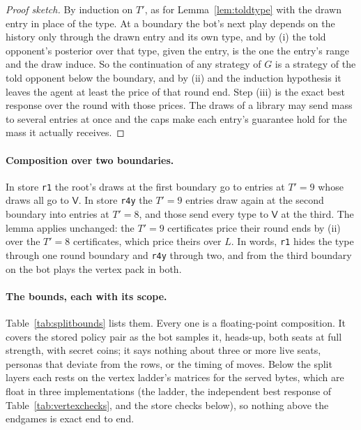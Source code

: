 \documentclass[11pt]{article}
\theoremstyle{plain}
\theoremstyle{definition}
\theoremstyle{remark}
\newcommand{\code}[1]{\texttt{\small #1}}
\newcommand{\game}{\ensuremath{G}}
\begin{document}
\begin{proof}[Proof sketch]
By induction on $T'$, as for Lemma~\ref{lem:toldtype} with the drawn
entry in place of the type. At a boundary the bot's next play depends
on the history only through the drawn entry and its own type, and by
(i) the told opponent's posterior over that type, given the entry, is
the one the entry's range and the draw induce. So the continuation of
any strategy of $\game$ is a strategy of the told opponent below the
boundary, and by (ii) and the induction hypothesis it leaves the agent
at least the price of that round end. Step (iii) is the exact best
response over the round with those prices. The draws of a library may
send mass to several entries at once and the caps make each entry's
guarantee hold for the mass it actually receives.
\end{proof}

\paragraph{Composition over two boundaries.} In store \code{r1} the
root's draws at the first boundary go to entries at $T'=9$ whose draws
all go to $\mathsf{V}$. In store \code{r4y} the $T'=9$ entries draw
again at the second boundary into entries at $T'=8$, and those send
every type to $\mathsf{V}$ at the third. The lemma applies unchanged:
the $T'=9$ certificates price their round ends by (ii) over the $T'=8$
certificates, which price theirs over $L$. In words, \code{r1} hides
the type through one round boundary and \code{r4y} through two, and
from the third boundary on the bot plays the vertex pack in both.

\paragraph{The bounds, each with its scope.}
Table~\ref{tab:splitbounds} lists them. Every one is a floating-point
composition. It covers the stored policy pair as the bot samples it,
heads-up, both seats at full strength, with secret coins; it says
nothing about three or more live seats, personas that deviate from the
rows, or the timing of moves. Below the split layers each rests on the
vertex ladder's matrices for the served bytes, which are float in three
implementations (the ladder, the independent best response of
Table~\ref{tab:vertexchecks}, and the store checks below), so nothing
above the endgames is exact end to end.
\end{document}
